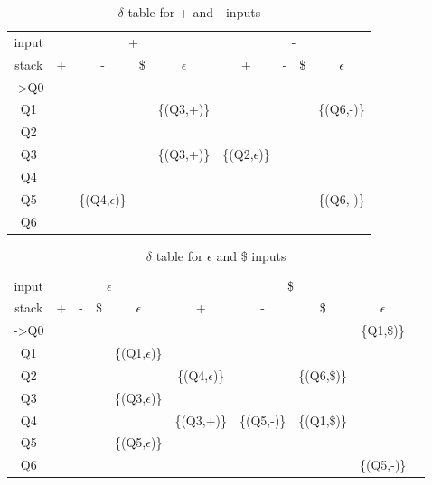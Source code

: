 \documentclass[12pt,a4paper]{report}
\begin{document}
\begin{table}[ht]
\caption{\label{tab:table-name} $\delta$ table for + and - inputs}
\centering
\begin{tabular}{ccccccccc}
\hline
\hline
input            & \multicolumn{4}{c}{+}            & \multicolumn{4}{c}{-}            \\
stack            & + & -          & \$ & $\epsilon$          & +          & - & \$ & $\epsilon$          \\
-\textgreater Q0 &   &            &    &            &            &   &    &            \\
Q1               &   &            &    & \{(Q3,+)\} &            &   &    & \{(Q6,-)\} \\
Q2               &   &            &    &            &            &   &    &            \\
Q3               &   &            &    & \{(Q3,+)\} & \{(Q2,$\epsilon$)\} &   &    &            \\
Q4               &   &            &    &            &            &   &    &            \\
Q5               &   & \{(Q4,$\epsilon$)\} &    &            &            &   &    & \{(Q6,-)\} \\
Q6               &   &            &    &            &            &   &    &     \\ \hline
\end{tabular}
\end{table}

\begin{table}[ht]
\caption{\label{tab:table-name} $\delta$ table for $\epsilon$ and \$ inputs}
\centering
\begin{tabular}{cccccccccc}
\hline
\hline
input            & \multicolumn{4}{c}{$\epsilon$} & \multicolumn{4}{c}{\$}                             \\
stack            & +   & -   & \$   & $\epsilon$           & +          & -          & \$          & $\epsilon$          \\
-\textgreater Q0 &     &     &      &             &            &            &             & \{Q1,\$)\} \\
Q1               &     &     &      & \{(Q1,$\epsilon$)\}  &            &            &             &            \\
Q2               &     &     &      &             & \{(Q4,$\epsilon$)\} &            & \{(Q6,\$)\} &            \\
Q3               &     &     &      & \{(Q3,$\epsilon$)\}  &            &            &             &            \\
Q4               &     &     &      &             & \{(Q3,+)\} & \{(Q5,-)\} & \{(Q1,\$)\} &            \\
Q5               &     &     &      & \{(Q5,$\epsilon$)\}  &            &            &             &            \\
Q6               &     &     &      &             &            &            &             & \{(Q5,-)\} \\ \hline

\end{tabular}
\end{table}
\end{document}
